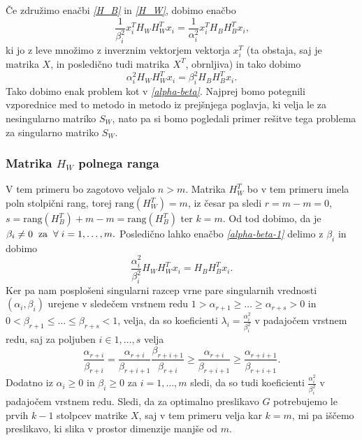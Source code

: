 \documentclass[mat1]{article}
\theoremstyle{definition}
\begin{document}

Če združimo enačbi \textit{\eqref{H_B}} in \textit{\eqref{H_W}}, dobimo enačbo
$$
\frac{1}{\beta_i^2} x_i^T H_W H_W^T x_i = \frac{1}{\alpha_i^2} x_i^T H_B H_B^T x_i
\text{,}
$$
ki jo z leve množimo z inverznim vektorjem vektorja $x_i^T$ (ta obstaja, saj je matrika $X$, in posledično tudi matrika $X^T$, obrnljiva) in tako dobimo
\begin{equation} \label{alpha-beta-1}
\alpha_i^2 H_W H_W^T x_i = \beta_i^2 H_B H_B^T x_i
\text{.}
\end{equation}
Tako dobimo enak problem kot v \textit{\eqref{alpha-beta}}.
Najprej bomo potegnili vzporednice med to metodo in metodo iz prejšnjega poglavja, ki velja le za nesingularno matriko $S_W$, nato pa si bomo pogledali primer rešitve tega problema za singularno matriko $S_W$.

\subsubsection{Matrika $H_W$ polnega ranga}
V tem primeru bo zagotovo veljalo $n > m$. Matrika $H_W^T$ bo v tem primeru imela poln stolpični rang, torej $\text{rang}(H_W^T) = m$, iz česar pa sledi $r = m - m = 0$, $s = \text{rang}(H_B^T) + m - m = \text{rang}(H_B^T)$ ter $k = m$. Od tod dobimo, da je $\beta_i \neq 0 \hspace{2mm}  \text{za} \hspace{2mm}\forall \hspace{1mm} i = 1, \ldots, m \text{.}$ Posledično lahko enačbo \textit{\eqref{alpha-beta-1}} delimo z $\beta_i$ in dobimo 
$$
\frac{\alpha_i^2}{\beta_i^2} H_W H_W^T x_i =  H_B H_B^T x_i
\text{.}
$$
Ker pa nam posplošeni singularni razcep vrne pare singularnih vrednosti $(\alpha_i, \beta_i)$ urejene v sledečem vrstnem redu $1 > \alpha_{r+1} \geq \ldots \geq \alpha_{r+s} > 0$ in $0 < \beta_{r+1} \leq \ldots \leq \beta_{r+s} < 1$, velja, da so koeficienti $\lambda_i = \frac{\alpha_i^2}{\beta_i^2}$ v padajočem vrstnem redu, saj za poljuben $i \in {1, \ldots, s}$ velja
$$
\frac{\alpha_{r+i}}{\beta_{r+i}} = 
\frac{\alpha_{r+i}}{\beta_{r+i+1}} \frac{\beta_{r+i + 1}}{\beta_{r+i}} 
\geq 
\frac{\alpha_{r+i}}{\beta_{r+i+1}}
\geq
\frac{\alpha_{r+i+1}}{\beta_{r+i+1}}
\text{.}
$$
Dodatno iz $\alpha_i \geq 0$ in $\beta_i \geq 0$ za $i = 1, \ldots, m$ sledi, da so tudi koeficienti $\frac{\alpha_i^2}{\beta_i^2}$ v padajočem vrstnem redu. Sledi, da za optimalno preslikavo $G$ potrebujemo le prvih $k - 1$ stolpcev matrike $X$, saj v tem primeru velja kar $k = m$, mi pa iščemo preslikavo, ki slika v prostor dimenzije manjše od $m$.
\end{document}
